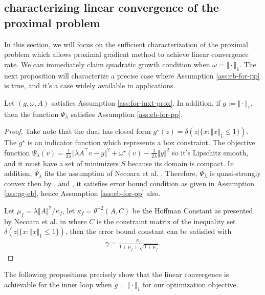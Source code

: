 \documentclass[12pt]{article}
\begin{document}
    \subsection{characterizing linear convergence of the proximal problem}
        In this section, we will focus on the sufficient characterization of the proximal problem which allows proximal gradient method to achieve linear convergence rate. 
        We can immediately claim quadratic growth condition when $\omega = \Vert \cdot\Vert_1$. 
        The next proposition will characterize a precise case where Assumption \ref{ass:eb-for-pp} is true, and it's a case widely available in applications. 
        \begin{proposition}
            Let $(g, \omega, A)$ satisfies Assumption \ref{ass:for-inxt-prox}. 
            In addition, if $g := \Vert \cdot\Vert_1$, then the function $\Psi_\lambda$ satisfies Assumption \ref{ass:eb-for-pp}. 
        \end{proposition}
        \begin{proof}
            Take note that the dual has closed form $g^\star(z) =\delta(z | \{x : \Vert x\Vert_1 \le 1\})$. 
            The $g^\star$ is an indicator function which represents a box constraint. 
            The objective function $\Psi_\lambda(v) = \frac{1}{2\lambda}\Vert \lambda A^\top v - y\Vert^2 + \omega^\star(v) - \frac{1}{2\lambda}\Vert y\Vert^2$ so it's Lipschitz smooth, and it must have a set of minimizers $S$ because its domain is compact. 
            In addition, $\Psi_\lambda$ fits the assumption of Necoara et al. \cite[Theorem 8]{necoara_linear_2019}. 
            Therefore, $\Psi_\lambda$ is quasi-strongly convex then by \cite[Theorem 4]{necoara_linear_2019}, and \cite[Theorem 7]{necoara_linear_2019}, it satisfies error bound condition as given in Assumption \ref{ass:pg-eb}, hence Assumption \ref{ass:eb-for-pp} also. 
            \par
            Let $\mu_f = \lambda\Vert A\Vert^2/\kappa_f$, let $\kappa_f = \theta^{-2}(A, C)$ be the Hoffman Constant as presented by Necoara et al. in \cite[Section 4]{necoara_linear_2019} where $C$ is the constraint matrix of the inequality set $\delta(z | \{x : \Vert x\Vert_1 \le 1\})$, then the error bound constant can be satisfied with
            \begin{align*}
                \gamma = \frac{\kappa_f}{1 + \mu_f + \sqrt{1 + \mu_f}}. 
            \end{align*}

        \end{proof}
        The following propositions precisely show that the linear convergence is achievable for the inner loop when $g = \Vert \cdot\Vert_1$ for our optimization objective. 
        \begin{proposition}\label{prop:inn-loop-lin-cnvg}
            
        \end{proposition}
\end{document}

